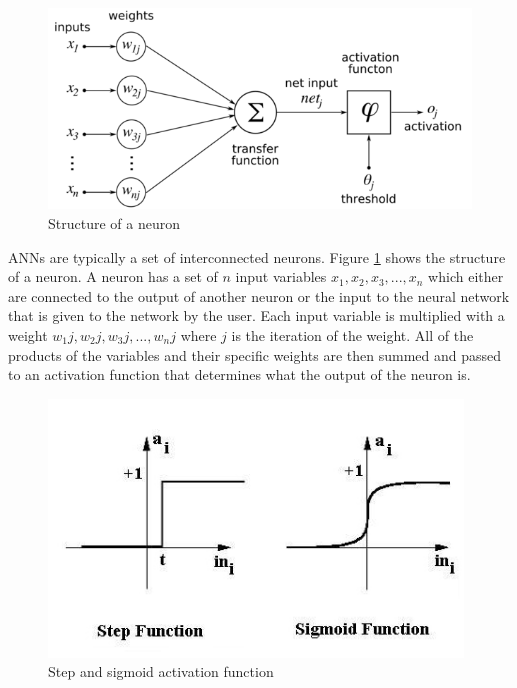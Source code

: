 \begin{figure}[ht]
	\centering
  \includegraphics[width=15cm]{figures/neuron_structure}
	\caption[Structure of a neuron]{Structure of a neuron \protect\footnotemark}
	\label{neuron}
\end{figure}

ANNs are typically a set of interconnected neurons. Figure \ref{neuron} shows the structure of a neuron. A neuron has a set of $n$ input variables $x_1, x_2, x_3, ..., x_n$ which either are connected to the output of another neuron or the input to the neural network that is given to the network by the user. Each input variable is multiplied with a weight $w_1j, w_2j, w_3j, ..., w_nj$ where $j$ is the iteration of the weight. All of the products of the variables and their specific weights are then summed and passed to an activation function that determines what the output of the neuron is.

\begin{figure}[ht]
	\centering
  \includegraphics[width=11cm]{figures/activation_functions}
	\caption[Step and sigmoid activation function]{Step and sigmoid activation function \protect\footnotemark}
	\label{activation_functions}
\end{figure}


